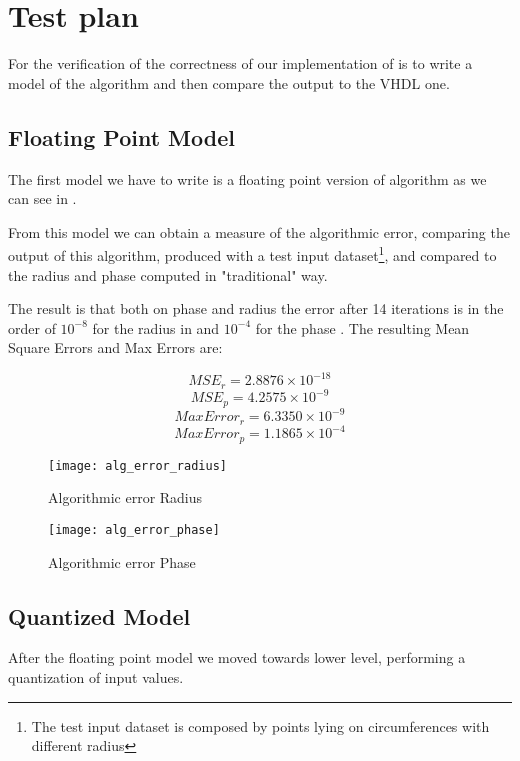 \chapter{Test plan}\label{ch:test}
For the verification of the correctness of our implementation of
\cordic{} is to write a \matlab{} model of the algorithm and then compare the
output to the VHDL one.

\section{Floating Point Model}\label{sec:floating_point_model}
The first model we have to write is a floating point version of \cordic{}
algorithm as we can see in .




From this model we can obtain a measure of the algorithmic error, comparing the 
output of this algorithm, produced with a test input dataset\footnote{The test 
input dataset is composed by points lying on circumferences with different 
radius}, and compared to the radius and phase computed in "traditional" way.

The result is that both on phase and radius the error after 14 iterations is in
the order of \(10^{-8}\) for the radius in  and 
\(10^{-4}\) for the phase . The resulting Mean
Square Errors and Max Errors are:

\[MSE_r = 2.8876\times10^{-18}\]
\[MSE_p = 4.2575\times10^{-9}\]
\[MaxError_r = 6.3350\times10^{-9}\]
\[MaxError_p = 1.1865\times10^{-4}\]


\begin{figure}[ht]
	\texttt{[image: alg\_error\_radius]}
	\caption{Algorithmic error Radius}\label{fig:floaterrorradius}
\end{figure}
\begin{figure}[ht]
	\texttt{[image: alg\_error\_phase]}
	\caption{Algorithmic error Phase}\label{fig:floaterrorphase}
\end{figure}
\section{Quantized Model}
After the floating point model we moved towards lower level, performing a
quantization of input values. 

